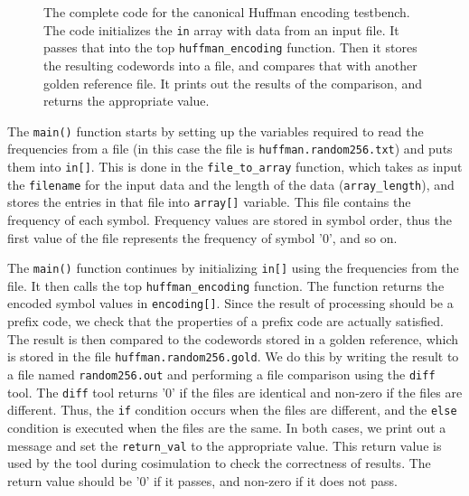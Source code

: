 \begin{figure}

\end{figure}
\begin{figure}

\caption{ The complete code for the canonical Huffman encoding testbench. The code initializes the \lstinline{in} array with data from an input file. It passes that into the top \lstinline{huffman_encoding} function. Then it stores the resulting codewords into a file, and compares that with another golden reference file. It prints out the results of the comparison, and returns the appropriate value.}
\label{fig:huffman_encoding_test.cpp}
\end{figure}

The \lstinline{main()} function starts by setting up the variables required to read the frequencies from a file (in this case the file is \texttt{huffman.random256.txt}) and puts them into \lstinline{in[]}. This is done in the \lstinline{file_to_array} function, which takes as input the \lstinline{filename} for the input data and the length of the data (\lstinline{array_length}), and stores the entries in that file into \lstinline{array[]} variable. This file contains the frequency of each symbol. Frequency values are stored in symbol order, thus the first value of the file represents the frequency of symbol '0', and so on. 

The \lstinline{main()} function continues by initializing \lstinline{in[]} using the frequencies from the file. It then calls the top \lstinline{huffman_encoding} function. The function returns the encoded symbol values in \lstinline{encoding[]}. Since the result of processing should be a prefix code, we check that the properties of a prefix code are actually satisfied.  The result is then compared to the codewords stored in a golden reference, which is stored in the file \texttt{huffman.random256.gold}. We do this by writing the result to a file named \texttt{random256.out} and performing a file comparison using the \texttt{diff} tool. The \texttt{diff} tool returns '0' if the files are identical and non-zero if the files are different. Thus, the \lstinline{if} condition occurs when the files are different, and the \lstinline{else} condition is executed when the files are the same. In both cases, we print out a message and set the \lstinline{return_val} to the appropriate value. This return value is used by the \VHLS tool during cosimulation to check the correctness of results.  The return value should be '0' if it passes, and non-zero if it does not pass.

